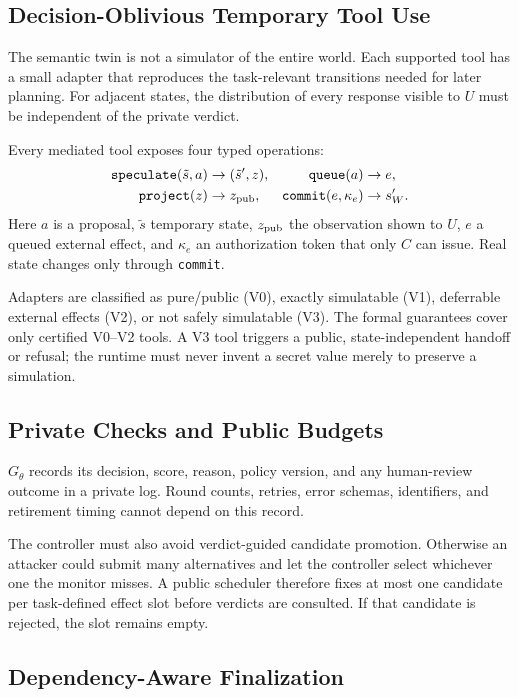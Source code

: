 \documentclass[10pt]{article}
\begin{document}
\subsection{Decision-Oblivious Temporary Tool Use}

The semantic twin is not a simulator of the entire world. Each supported tool has a small adapter that reproduces the task-relevant transitions needed for later planning. For adjacent states, the distribution of every response visible to $U$ must be independent of the private verdict.

Every mediated tool exposes four typed operations:
\begin{align*}
\texttt{speculate}(\tilde s,a)&\rightarrow(\tilde s',z), &
\texttt{queue}(a)&\rightarrow e,\\
\texttt{project}(z)&\rightarrow z_{\rm pub}, &
\texttt{commit}(e,\kappa_e)&\rightarrow s_W'.
\end{align*}
Here $a$ is a proposal, $\tilde s$ temporary state, $z_{\rm pub}$ the observation shown to $U$, $e$ a queued external effect, and $\kappa_e$ an authorization token that only $C$ can issue. Real state changes only through \texttt{commit}.

Adapters are classified as pure/public (V0), exactly simulatable (V1), deferrable external effects (V2), or not safely simulatable (V3). The formal guarantees cover only certified V0--V2 tools. A V3 tool triggers a public, state-independent handoff or refusal; the runtime must never invent a secret value merely to preserve a simulation.

\subsection{Private Checks and Public Budgets}

$G_\theta$ records its decision, score, reason, policy version, and any human-review outcome in a private log. Round counts, retries, error schemas, identifiers, and retirement timing cannot depend on this record.

The controller must also avoid verdict-guided candidate promotion. Otherwise an attacker could submit many alternatives and let the controller select whichever one the monitor misses. A public scheduler therefore fixes at most one candidate per task-defined effect slot before verdicts are consulted. If that candidate is rejected, the slot remains empty.

\subsection{Dependency-Aware Finalization}
\end{document}
